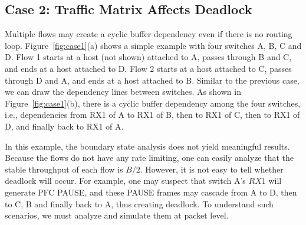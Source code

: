 \subsection{Case 2: Traffic Matrix Affects Deadlock}
\secspace

Multiple flows may create a cyclic buffer dependency even if there is no routing loop.
Figure~\ref{fig:case1}(a) shows a simple example with four switches A, B, C and D. 
Flow 1 starts at a host (not shown) attached to A, passes through B and C, and ends at a 
host attached to D. Flow 2 starts at a host attached to C, passes through D and A, and 
ends at a host attached to B.
Similar to the previous case, we can draw the dependency lines between switches. As shown in 
Figure~\ref{fig:case1}(b), there is a cyclic buffer dependency among the four switches, i.e., 
dependencies from RX1 of A to RX1 of B, then to RX1 of C, then to RX1 of D, and finally back to RX1 of A.


In this example, the boundary state analysis does not yield meaningful
results. Because the flows do not have any rate limiting, one can easily analyze that the 
stable throughput of each flow is $B/2$. However, it is not easy to tell whether deadlock 
will occur. For example, one may suspect that switch A's $RX1$ will generate PFC PAUSE, and 
these PAUSE frames may cascade from A to D, then to C, B and finally back to A, thus creating deadlock.
To understand such scenarios, we must analyze and simulate them at packet level.


